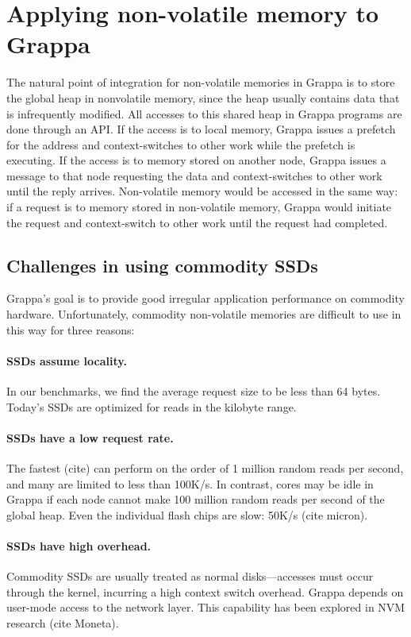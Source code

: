 \section{Applying non-volatile memory to Grappa}
The natural point of integration for non-volatile memories in Grappa
is to store the global heap in nonvolatile memory, since the heap
usually contains data that is infrequently modified. All accesses to
this shared heap in Grappa programs are done through an API. If the
access is to local memory, Grappa issues a prefetch for the address
and context-switches to other work while the prefetch is executing. If
the access is to memory stored on another node, Grappa issues a
message to that node requesting the data and context-switches to other
work until the reply arrives. Non-volatile memory would be accessed in
the same way: if a request is to memory stored in non-volatile memory,
Grappa would initiate the request and context-switch to other work
until the request had completed.

\subsection{Challenges in using commodity SSDs}
Grappa’s goal is to provide good irregular application performance on
commodity hardware. Unfortunately, commodity non-volatile memories are
difficult to use in this way for three reasons:

\paragraph{SSDs assume locality.} In our benchmarks, we find the average request size to be
less than 64 bytes. Today’s SSDs are optimized for reads in the
kilobyte range.  

\paragraph{SSDs have a low request rate.} The fastest (cite) can
perform on the order of 1 million random reads per second, and many
are limited to less than 100K/s. In contrast, cores may be idle in
Grappa if each node cannot make 100 million random reads per second of
the global heap. Even the individual flash chips are slow: 50K/s (cite
micron).  

\paragraph{SSDs have high overhead.} Commodity SSDs are usually treated
as normal disks---accesses must occur through the kernel, incurring a
high context switch overhead. Grappa depends on user-mode access to
the network layer. This capability has been explored in NVM research
(cite Moneta).  

